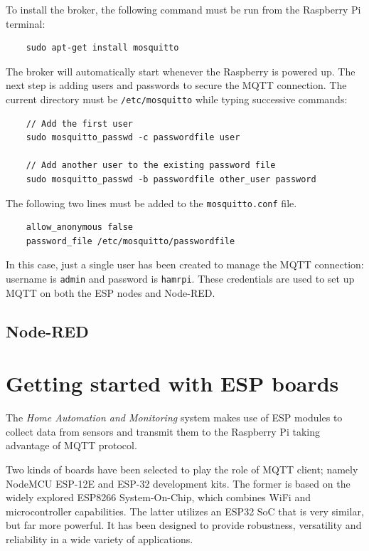 To install the broker, the following command must be run from the Raspberry Pi terminal:

\begin{verbatim}
    sudo apt-get install mosquitto
\end{verbatim}

\noindent
The broker will automatically start whenever the Raspberry is powered up. The next step is adding users and passwords to secure the MQTT connection. The current directory must be \texttt{/etc/mosquitto} while typing successive commands:

\begin{verbatim}
    // Add the first user
    sudo mosquitto_passwd -c passwordfile user
    
    // Add another user to the existing password file
    sudo mosquitto_passwd -b passwordfile other_user password
\end{verbatim}

\noindent
The following two lines must be added to the \texttt{mosquitto.conf} file.

\begin{verbatim}
    allow_anonymous false
    password_file /etc/mosquitto/passwordfile
\end{verbatim}

\noindent
In this case, just a single user has been created to manage the MQTT connection: username is \texttt{admin} and password is \texttt{hamrpi}. These credentials are used to set up MQTT on both the ESP nodes and Node-RED.

\subsection{Node-RED}

\section{Getting started with ESP boards}
The \textit{Home Automation and Monitoring} system makes use of ESP modules to collect data from sensors and transmit them to the Raspberry Pi taking advantage of MQTT protocol.

Two kinds of boards have been selected to play the role of MQTT client; namely NodeMCU ESP-12E and ESP-32 development kits. The former is based on the widely explored ESP8266 System-On-Chip, which combines WiFi and microcontroller capabilities. The latter utilizes an ESP32 SoC that is very similar, but far more powerful. It has been designed to provide robustness, versatility and reliability in a wide variety of applications.

